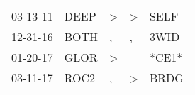 \begin{supertabular}{lllll}
 03-13-11 &  DEEP &  \textgreater &  \textgreater &   SELF \\
 12-31-16 &  BOTH &             , &             , &   3WID \\
 01-20-17 &  GLOR &  \textgreater &               &  *CE1* \\
 03-11-17 &  ROC2 &             , &  \textgreater &   BRDG \\
\end{supertabular}
